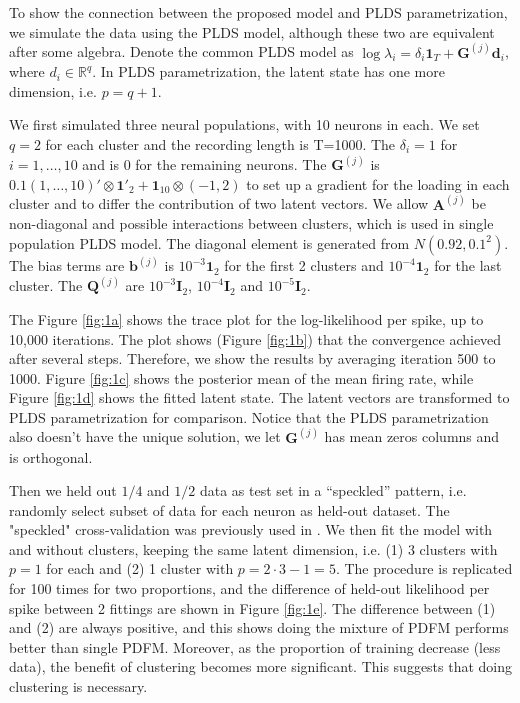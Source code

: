 \documentclass{article}
\begin{document}
	To show the connection between the proposed model and PLDS parametrization, we simulate the data using the PLDS model, although these two are equivalent after some algebra. Denote the common PLDS model as $\log \lambda_i = \delta_i\bm{1}_T + \bm{G}^{(j)}\bm{d}_i$, where $d_i\in \mathbb{R}^q$. In PLDS parametrization, the latent state has one more dimension, i.e. $p=q+1$.
	
	We first simulated three neural populations, with 10 neurons in each. We set $q=2$ for each cluster and the recording length is T=1000. The $\delta_i = 1$ for $i=1,\ldots, 10$ and is $0$ for the remaining neurons. The $\bm{G}^{(j)}$ is $0.1(1,\ldots,10)'\otimes\bm{1}'_2 + \bm{1}_{10}\otimes(-1, 2)$ to set up a gradient for the loading in each cluster and to differ the contribution of two latent vectors. We allow $\bm{A}^{(j)}$ be non-diagonal and possible interactions between clusters, which is used in single population PLDS model. The diagonal element is generated from $N(0.92, 0.1^2)$. The bias terms are $\bm{b}^{(j)}$ is $10^{-3}\bm{1}_2$ for the first 2 clusters and $10^{-4}\bm{1}_2$ for the last cluster. The $\bm{Q}^{(j)}$ are $10^{-3}\bm{I}_2$, $10^{-4}\bm{I}_2$ and $10^{-5}\bm{I}_2$.
	
	The Figure \ref{fig:1a} shows the trace plot for the log-likelihood per spike, up to 10,000 iterations. The plot shows (Figure \ref{fig:1b}) that the convergence achieved after several steps. Therefore, we show the results by averaging iteration 500 to 1000. Figure \ref{fig:1c} shows the posterior mean of the mean firing rate, while Figure \ref{fig:1d} shows the fitted latent state. The latent vectors are transformed to PLDS parametrization for comparison. Notice that the PLDS parametrization also doesn't have the unique solution, we let $\bm{G}^{(j)}$ has mean zeros columns and is orthogonal.
	
	Then we held out $1/4$ and $1/2$ data as test set in a “speckled” pattern, i.e. randomly select subset of data for each neuron as held-out dataset. The "speckled" cross-validation was previously used in \cite{Williams2020}. We then fit the model with and without clusters, keeping the same latent dimension, i.e. (1) 3 clusters with $p=1$ for each and (2) 1 cluster with $p=2\cdot 3 - 1 = 5$. The procedure is replicated for 100 times for two proportions, and the difference of held-out likelihood per spike between 2 fittings are shown in Figure \ref{fig:1e}. The difference between (1) and (2) are always positive, and this shows doing the mixture of PDFM performs better than single PDFM. Moreover, as the proportion of training decrease (less data), the benefit of clustering becomes more significant. This suggests that doing clustering is necessary.
	
\end{document}
